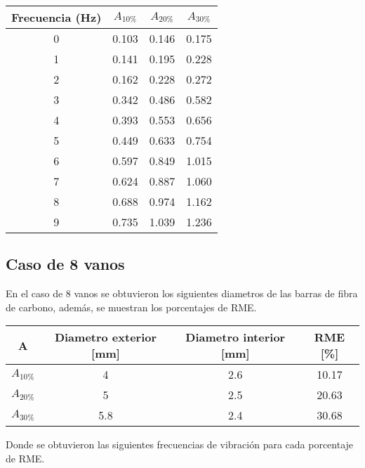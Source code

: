 \begin{table}[H]
    \centering
    \begin{tabular}{cccc}
    \toprule
     Frecuencia (Hz) & $A_{10\%}$ & $A_{20\%}$ & $A_{30\%}$ \\
    \midrule
     0 &       0.103 &       0.146 &       0.175 \\
     1 &       0.141 &       0.195 &       0.228 \\
     2 &       0.162 &       0.228 &       0.272 \\
     3 &       0.342 &       0.486 &       0.582 \\
     4 &       0.393 &       0.553 &       0.656 \\
     5 &       0.449 &       0.633 &       0.754 \\
     6 &       0.597 &       0.849 &       1.015 \\
     7 &       0.624 &       0.887 &       1.060 \\
     8 &       0.688 &       0.974 &       1.162 \\
     9 &       0.735 &       1.039 &       1.236 \\
    \bottomrule
    \end{tabular}
\end{table}


\subsection{Caso de 8 vanos}
En el caso de 8 vanos se obtuvieron los siguientes diametros de las barras de fibra de carbono, además, se muestran los porcentajes de RME.

\begin{table}[H]
    \centering
    \begin{tabular}{cccc}
    \toprule
     A & Diametro exterior [mm] & Diametro interior [mm] & RME [\%] \\
    \midrule
     $A_{10\%}$ &  4 &  2.6 &  10.17 \\
     $A_{20\%}$ &  5 &  2.5 &  20.63 \\
     $A_{30\%}$ &  5.8 &  2.4 &  30.68 \\
    \bottomrule
    \end{tabular}
\end{table}

Donde se obtuvieron las siguientes frecuencias de vibración para cada porcentaje de RME.

